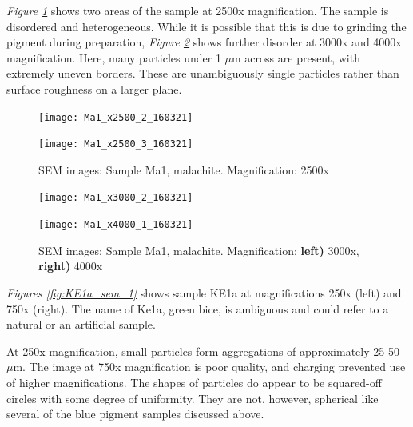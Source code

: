 \textit{Figure \ref{fig:Ma1_sem_3}} shows two areas of the sample at 2500x magnification. The sample is disordered and heterogeneous. While it is possible that this is due to grinding the pigment during preparation, \textit{Figure \ref{fig:Ma1_sem_4}} shows further disorder at 3000x and 4000x magnification. Here, many particles under 1 $\mu$m across are present, with extremely uneven borders. These are unambiguously single particles rather than surface roughness on a larger plane.


\begin{figure}[H]
\centering
\begin{minipage}{.45\textwidth}
  \centering
  \texttt{[image: Ma1\_x2500\_2\_160321]}
\end{minipage}
\begin{minipage}{.45\textwidth}
  \centering
  \texttt{[image: Ma1\_x2500\_3\_160321]}
\end{minipage}
\caption[SEM images: Sample Ma1, malachite]{SEM images: Sample Ma1, malachite. Magnification: 2500x}
\label{fig:Ma1_sem_3}
\end{figure}

\begin{figure}[H]
\centering
\begin{minipage}{.45\textwidth}
  \centering
  \texttt{[image: Ma1\_x3000\_2\_160321]}
\end{minipage}
\begin{minipage}{.45\textwidth}
  \centering
  \texttt{[image: Ma1\_x4000\_1\_160321]}
\end{minipage}
\caption[SEM images: Sample Ma1, malachite]{SEM images: Sample Ma1, malachite. Magnification: \textbf{left)} 3000x, \textbf{right)} 4000x}
\label{fig:Ma1_sem_4}
\end{figure}


\textit{Figures \ref{fig:KE1a_sem_1}} shows sample KE1a at magnifications 250x (left) and 750x (right). The name of Ke1a, green bice, is ambiguous and could refer to a natural or an artificial sample.

At 250x magnification, small particles form aggregations of approximately 25-50 $\mu$m. The image at 750x magnification is poor quality, and charging prevented use of higher magnifications. The shapes of particles do appear to be squared-off circles with some degree of uniformity.  They are not, however, spherical like several of the blue pigment samples discussed above. 

